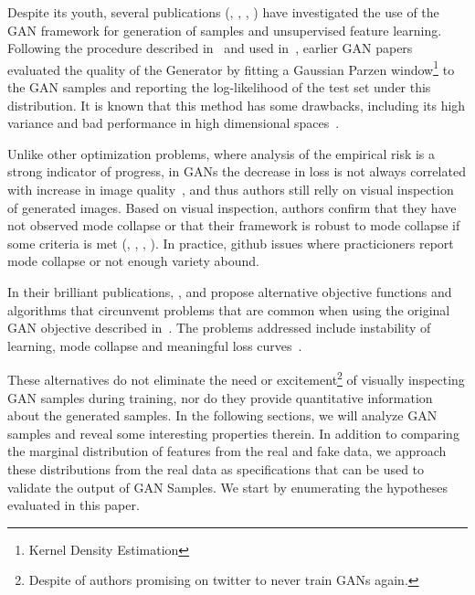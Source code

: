 Despite its youth, several publications (\cite{arjovsky2017towards}, 
\cite{salimans2016improved}, \cite{zhao2016energy}, 
\cite{radford2015unsupervised}) have investigated the use of the
GAN framework for generation of samples and unsupervised feature learning. 
Following the procedure described in~\cite{breuleux2011quickly} and
used in~\cite{goodfellow2014generative}, earlier GAN papers evaluated
the quality of the Generator by fitting a Gaussian Parzen window\footnote{Kernel
Density Estimation} to the GAN samples and reporting the log-likelihood of the
test set under this distribution. It is known that this method has some drawbacks, 
including its high variance and bad performance in high dimensional
spaces~\cite{goodfellow2014generative}.

Unlike other optimization problems, where analysis of
the empirical risk is a strong indicator of progress, in GANs the decrease in loss 
is not always correlated with increase in image quality~\cite{arjovsky2017wasserstein}, and thus authors still relly on visual 
inspection of generated images. Based on visual inspection, authors confirm that
they have not observed mode collapse or that their framework is robust to mode
collapse if some criteria is met (\cite{arjovsky2017wasserstein}, 
\cite{gulrajani2017improved}, \cite{mao2016least}, \cite{radford2015unsupervised}).
In practice, github issues where practicioners report mode collapse or not enough 
variety abound.

In their brilliant publications, \cite{mao2016least},
\cite{arjovsky2017wasserstein} and \cite{gulrajani2017improved} propose alternative
objective functions and algorithms that circunvemt problems that are common when using the
original GAN objective described in~\cite{goodfellow2014generative}. The problems addressed include instability of learning,
mode collapse and meaningful loss curves~\cite{salimans2016improved}.

These alternatives do not eliminate the need or excitement\footnote{Despite of
authors promising on twitter to never train GANs again.} 
of visually inspecting GAN samples during training, nor do they provide
quantitative information about the generated samples. In the following sections, we
will analyze GAN samples and reveal some interesting properties therein. 
In addition to comparing the marginal distribution
of features from the real and fake data, we approach these distributions from
the real data as specifications that can be used to validate the output of GAN Samples. 
We start by enumerating the hypotheses evaluated in this paper.

